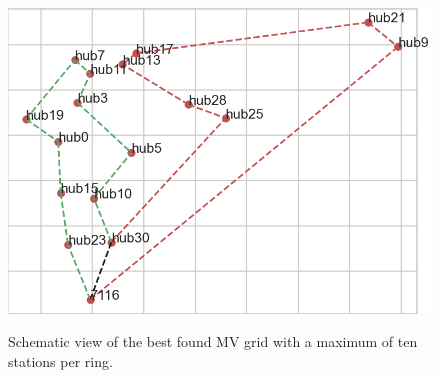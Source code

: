 \begin{figure}[h]
	\begin{centering}
		{\includegraphics[scale=0.7]{figures/experiments/ringsize/size_10.png}}
		\caption{Schematic view of the best found MV grid with a maximum of ten stations per ring.}
		\label{fig:ringsize_10}
	\end{centering}
\end{figure}
